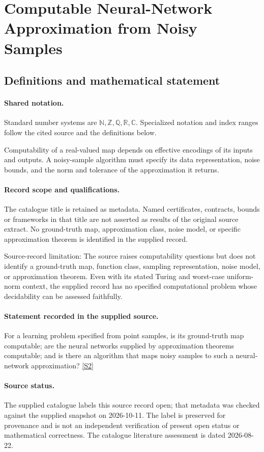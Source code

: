\documentclass[11pt]{article}
\newcommand{\sref}[2]{\hyperlink{source:#1:#2}{[S#2]}}
\begin{document}
\section{Computable Neural-Network Approximation from Noisy Samples}\label{statement}

\subsection{Definitions and mathematical statement}

\paragraph{Shared notation.}Standard number systems are $\mathbb N,\mathbb Z,\mathbb Q,\mathbb R,\mathbb C$. Specialized notation and index ranges follow the cited source and the definitions below.


Computability of a real-valued map depends on effective encodings of its inputs and outputs. A noisy-sample algorithm must specify its data representation, noise bounds, and the norm and tolerance of the approximation it returns.
\paragraph{Record scope and qualifications.}
The catalogue title is retained as metadata. Named certificates, contracts, bounds or frameworks in that title are not asserted as results of the original source extract.
No ground-truth map, approximation class, noise model, or specific approximation theorem is identified in the supplied record.

Source-record limitation: The source raises computability questions but does not identify a ground-truth map, function class, sampling representation, noise model, or approximation theorem. Even with its stated Turing and worst-case uniform-norm context, the supplied record has no specified computational problem whose decidability can be assessed faithfully.
\paragraph{Statement recorded in the supplied source.}
For a learning problem specified from point samples, is its ground-truth map computable; are the neural networks supplied by approximation theorems computable; and is there an algorithm that maps noisy samples to such a neural-network approximation? \sref{statement}{2}
\paragraph{Source status.}
The supplied catalogue labels this source record open; that metadata was checked against the supplied snapshot on 2026-10-11. The label is preserved for provenance and is not an independent verification of present open status or mathematical correctness. The catalogue literature assessment is dated 2026-08-22.
\end{document}
